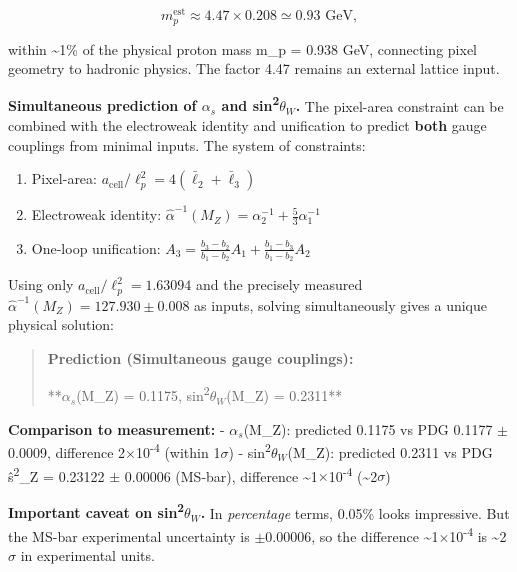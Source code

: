 \documentclass[11pt,a4paper]{article}
\theoremstyle{remark}
\providecommand{\tightlist}{%
  \setlength{\itemsep}{0pt}\setlength{\parskip}{0pt}}
\begin{document}
\[
m_p^{\mathrm{est}} \approx 4.47 \times 0.208 \simeq 0.93 \text{ GeV},
\]

within \textasciitilde1\% of the physical proton mass m\_p = 0.938 GeV, connecting pixel
geometry to hadronic physics. The factor 4.47 remains an external lattice input.

\textbf{Simultaneous prediction of $\alpha_s$ and sin\textsuperscript{2}$\theta_W$.} The pixel-area constraint can
be combined with the electroweak identity and unification to predict \textbf{both}
gauge couplings from minimal inputs. The system of constraints:

\begin{enumerate}
\def\labelenumi{\arabic{enumi}.}
\tightlist
\item
  Pixel-area: \(a_{\mathrm{cell}}/\ell_p^2 = 4(\bar{\ell}_2 + \bar{\ell}_3)\)
\item
  Electroweak identity: \(\hat{\alpha}^{-1}(M_Z) = \alpha_2^{-1} + \frac{5}{3}\alpha_1^{-1}\)
\item
  One-loop unification: \(A_3 = \frac{b_3-b_2}{b_1-b_2}A_1 + \frac{b_1-b_3}{b_1-b_2}A_2\)
\end{enumerate}

Using only \(a_{\mathrm{cell}}/\ell_p^2 = 1.63094\) and the precisely measured
\(\hat{\alpha}^{-1}(M_Z) = 127.930 \pm 0.008\) as inputs, solving simultaneously
gives a unique physical solution:

\begin{quote}
\textbf{Prediction (Simultaneous gauge couplings):}

**$\alpha_s$(M\_Z) = 0.1175, sin\textsuperscript{2}$\theta_W$(M\_Z) = 0.2311**
\end{quote}

\textbf{Comparison to measurement:}
- $\alpha_s$(M\_Z): predicted 0.1175 vs PDG 0.1177 \ensuremath{\pm} 0.0009, difference 2\ensuremath{\times}10\textsuperscript{-4} (within 1\ensuremath{\sigma})
- sin\textsuperscript{2}$\theta_W$(M\_Z): predicted 0.2311 vs PDG \^{s}\textsuperscript{2}\_Z = 0.23122 \ensuremath{\pm} 0.00006 (MS-bar), difference \textasciitilde1\ensuremath{\times}10\textsuperscript{-4} (\textasciitilde2\ensuremath{\sigma})

\textbf{Important caveat on sin\textsuperscript{2}$\theta_W$.} In \emph{percentage} terms, 0.05\% looks impressive. But
the MS-bar experimental uncertainty is \ensuremath{\pm}0.00006, so the difference \textasciitilde1\ensuremath{\times}10\textsuperscript{-4} is
\textasciitilde2\ensuremath{\sigma} in experimental units.
\end{document}

